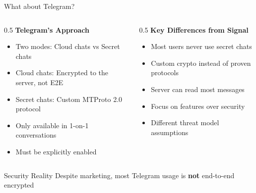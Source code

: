\ifdefined\PRESENTATION\else\PassOptionsToClass{handout}{beamer}\fi\documentclass[aspectratio=169, lualatex]{beamer}
\begin{document}
\begin{frame}{What about Telegram?}
	\begin{columns}
		\begin{column}{0.5\textwidth}
			\textbf{Telegram's Approach}
			\begin{itemize}
				\item Two modes: Cloud chats vs Secret chats
				\item Cloud chats: Encrypted to the server, not E2E
				\item Secret chats: Custom MTProto 2.0 protocol
				\item Only available in 1-on-1 conversations
				\item Must be explicitly enabled
			\end{itemize}
		\end{column}
		\begin{column}{0.5\textwidth}
			\textbf{Key Differences from Signal}
			\begin{itemize}
				\item Most users never use secret chats
				\item Custom crypto instead of proven protocols
				\item Server can read most messages
				\item Focus on features over security
				\item Different threat model assumptions
			\end{itemize}
		\end{column}
	\end{columns}
	\begin{alertblock}{Security Reality}
		Despite marketing, most Telegram usage is \textbf{not} end-to-end encrypted
	\end{alertblock}
\end{frame}
\end{document}
